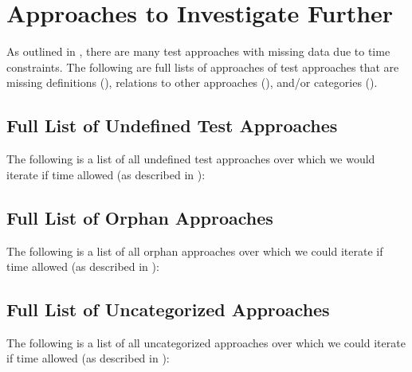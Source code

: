 \chapter{Approaches to Investigate Further}\label{app-future}

As outlined in , there are many test approaches with
missing data due to time constraints. The following are full lists of
approaches of test approaches that are missing definitions
(), relations to other approaches
(), and/or categories ().

\section{Full List of Undefined Test Approaches}\label{app-undef-terms}

The following is a list of all \the\numexpr\UndefAfter{} undefined test
approaches over which we would iterate if time allowed (as described in
):

\begin{multicols}{2}
    \raggedright
    \begin{enumerate}
        
    \end{enumerate}
\end{multicols}

\section{Full List of Orphan Approaches}\label{app-orphan-terms}

The following is a list of all \orphanCount{} orphan approaches over which we
could iterate if time allowed (as described in ):

\begin{multicols}{2}
    \raggedright
    \begin{enumerate}
        
    \end{enumerate}
\end{multicols}

\newpage
\section{Full List of Uncategorized Approaches}\label{app-uncat-terms}

The following is a list of all \uncatCount{} uncategorized approaches over
which we could iterate if time allowed (as described in ):

\begin{multicols}{2}
    \raggedright
    \begin{enumerate}
        
    \end{enumerate}
\end{multicols}
